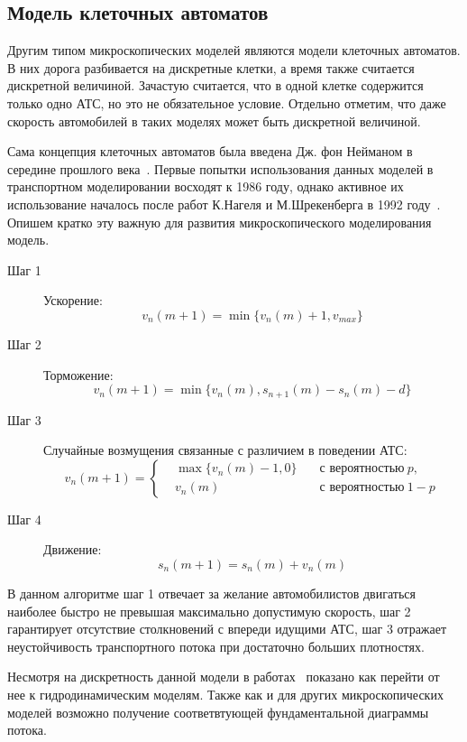 \subsection{Модель клеточных автоматов}\label{subsec:ch1/sec2/sub4}
Другим типом микроскопических моделей являются модели клеточных автоматов.
В них дорога разбивается на дискретные клетки, а время также считается дискретной величиной.
Зачастую считается, что в одной клетке содержится только одно АТС, но это не обязательное условие.
Отдельно отметим, что даже скорость автомобилей в таких моделях может быть дискретной величиной.

Сама концепция клеточных автоматов была введена Дж. фон Нейманом в середине прошлого века~\cite{neiman2010dj}.
Первые попытки использования данных моделей в транспортном моделировании восходят к 1986 году, однако активное их использование началось после работ К.Нагеля и М.Шрекенберга в 1992 году~\cite{nagel1992cellular}.
Опишем кратко эту важную для развития микроскопического моделирования модель.

\begin{description}
  \item[Шаг 1] Ускорение:
    \[
        v_n(m+1) = \min\{v_n(m) + 1, v_{max}\}
    \]
  \item[Шаг 2] Торможение:
    \[
        v_n(m+1) = \min\{v_n(m), s_{n+1}(m) - s_n(m) - d\}
    \]
  \item[Шаг 3] Случайные возмущения связанные с различием в поведении АТС:
    \[
        v_n(m+1) = 
        \left\{
        \begin{alignedat}{3}
            &\max\{v_n(m) - 1, 0\} \quad&\text{с вероятностью}\ p,  \\
            &v_n(m) \quad&\text{с вероятностью}\ 1 - p
        \end{alignedat}
        \right.
    \]
  \item[Шаг 4] Движение:
    \[
        s_n(m+1) = s_n(m) + v_n(m)
    \]
\end{description}
В данном алгоритме шаг 1 отвечает за желание автомобилистов двигаться наиболее быстро не превышая максимально допустимую скорость, шаг 2 гарантирует отсутствие столкновений с впереди идущими АТС, шаг 3 отражает неустойчивость транспортного потока при достаточно больших плотностях.

Несмотря на дискретность данной модели в работах~\cite{benassi1987hydrodynamical} показано как перейти от нее к гидродинамическим моделям.
Также как и для других микроскопических моделей возможно получение соответвтующей фундаментальной диаграммы потока.

